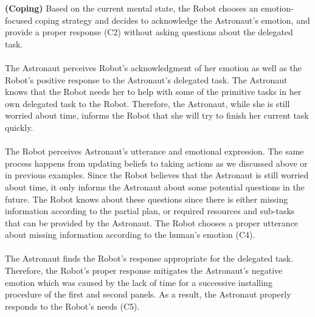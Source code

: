 \noindent\textbf{(Coping)} Based on the current mental state, the Robot chooses
an emotion-focused coping strategy and decides to acknowledge the Astronaut's
emotion, and provide a proper response (C2) without asking questions about the
delegated task.\\

\noindent{}\\

The Astronaut perceives Robot's acknowledgment of her emotion as well as the
Robot's positive response to the Astronaut's delegated task. The Astronaut knows
that the Robot needs her to help with some of the primitive tasks in her own
delegated task to the Robot. Therefore, the Astronaut, while she is still
worried about time, informs the Robot that she will try to finish her current
task quickly.\\

\noindent{}\\

The Robot perceives Astronaut's utterance and emotional expression. The same
process happens from updating beliefs to taking actions as we discussed above or
in previous examples. Since the Robot believes that the Astronaut is still
worried about time, it only informs the Astronaut about some potential questions
in the future. The Robot knows about these questions since there is either
missing information according to the partial plan, or required resources and
sub-tasks that can be provided by the Astronaut. The Robot chooses a proper
utterance about missing information according to the human's emotion (C4).\\

\noindent{}\\

The Astronaut finds the Robot's response appropriate for the delegated task.
Therefore, the Robot's proper response mitigates the Astronaut's negative
emotion which was caused by the lack of time for a successive installing
procedure of the first and second panels. As a result, the Astronaut properly
responds to the Robot's needs (C5).\\

